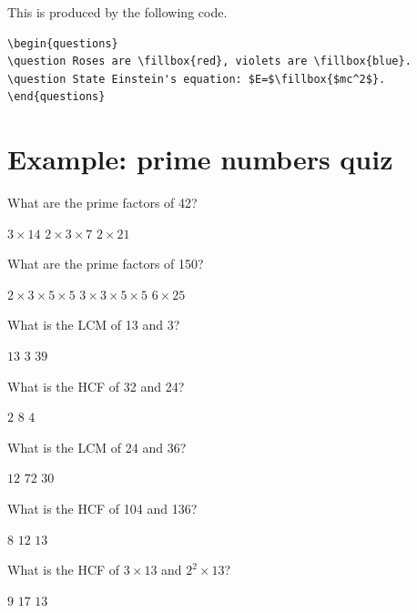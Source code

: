 \documentclass{article}
\begin{document}
This is produced by the following code.
\begin{Verbatim}[frame=single]
\begin{questions}
\question Roses are \fillbox{red}, violets are \fillbox{blue}.
\question State Einstein's equation: $E=$\fillbox{$mc^2$}.
\end{questions}
\end{Verbatim}


\section{Example: prime numbers quiz}

\begin{questions}

\question
What are the prime factors of 42?
\begin{choices}
\choice $3\times 14$
\correctchoice $2\times 3\times 7$
\choice $2\times 21$
\end{choices}

\question
What are the prime factors of 150?
\begin{choices}
\correctchoice $2\times 3\times 5\times 5$
\choice $3\times 3\times 5\times 5$
\choice $6\times 25$
\end{choices}

\question
What is the LCM of 13 and 3?
\begin{choices}
\choice $13$
\choice $3$
\correctchoice $39$
\end{choices}

\question
What is the HCF of 32 and 24?
\begin{choices}
\choice $2$
\correctchoice $8$
\choice $4$
\end{choices}

\question
What is the LCM of 24 and 36?
\begin{choices}
\choice $12$
\correctchoice $72$
\choice $30$
\end{choices}

\question
What is the HCF of 104 and 136?
\begin{choices}
\correctchoice $8$
\choice $12$
\choice $13$
\end{choices}

\question
What is the HCF of $3\times 13$ and $2^2\times 13$?
\begin{choices}
\choice $9$
\choice $17$
\correctchoice $13$
\end{choices}


\end{questions}
\end{document}
